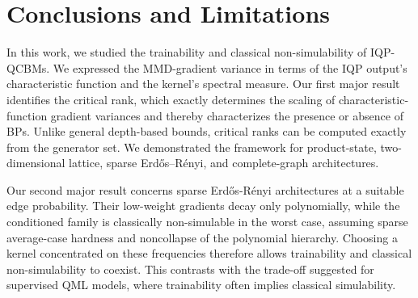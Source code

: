 \documentclass{article}
\theoremstyle{plain}
\theoremstyle{definition}
\theoremstyle{remark}
\newcommand{\MMD}{\ensuremath{\mathrm{MMD}}\xspace}
\begin{document}
\section{Conclusions and Limitations}
\label{sec:conclusion}
In this work, we studied the trainability and classical non-simulability of IQP-QCBMs. We expressed the MMD-gradient variance in terms of the IQP output's characteristic function and the kernel's spectral measure. Our first major result identifies the critical rank, which exactly determines the scaling of characteristic-function gradient variances and thereby characterizes the presence or absence of BPs. Unlike general depth-based bounds, critical ranks can be computed exactly from the generator set. We demonstrated the framework for product-state, two-dimensional lattice, sparse Erdős--Rényi, and complete-graph architectures.

Our second major result concerns sparse Erd\H os-R\'enyi architectures at a suitable edge probability. Their low-weight gradients decay only polynomially, while the conditioned family is classically non-simulable in the worst case, assuming sparse average-case hardness and noncollapse of the polynomial hierarchy. Choosing a kernel concentrated on these frequencies therefore allows trainability and classical non-simulability to coexist. This contrasts with the trade-off suggested for supervised QML models, where trainability often implies classical simulability.
\end{document}
